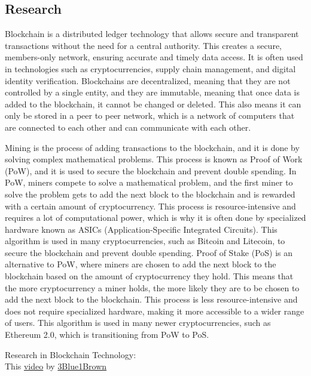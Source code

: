 \documentclass[12pt, a4paper]{scrartcl}
\begin{document}
\subsection{Research}

Blockchain is a distributed ledger technology that allows secure and transparent transactions without the need for a central authority.
This creates a secure, members-only network, ensuring accurate and timely data access. It is often used in technologies such as cryptocurrencies, supply chain management, and digital identity verification.
Blockchains are decentralized, meaning that they are not controlled by a single entity, and they are immutable, meaning that once data is added to the blockchain, it cannot be changed or deleted.
This also means it can only be stored in a peer to peer network, which is a network of computers that are connected to each other and can communicate with each other.


Mining is the process of adding transactions to the blockchain, and it is done by solving complex mathematical problems.
This process is known as Proof of Work (PoW), and it is used to secure the blockchain and prevent double spending.
In PoW, miners compete to solve a mathematical problem, and the first miner to solve the problem gets to add the next block to the blockchain and is rewarded with a certain amount of cryptocurrency.
This process is resource-intensive and requires a lot of computational power, which is why it is often done by specialized hardware known as ASICs (Application-Specific Integrated Circuits). 
This algorithm is used in many cryptocurrencies, such as Bitcoin and Litecoin, to secure the blockchain and prevent double spending.
Proof of Stake (PoS) is an alternative to PoW, where miners are chosen to add the next block to the blockchain based on the amount of cryptocurrency they hold.
This means that the more cryptocurrency a miner holds, the more likely they are to be chosen to add the next block to the blockchain.
This process is less resource-intensive and does not require specialized hardware, making it more accessible to a wider range of users.
This algorithm is used in many newer cryptocurrencies, such as Ethereum 2.0, which is transitioning from PoW to PoS.


Research in Blockchain Technology:
\\
This \href{https://youtu.be/bBC-nXj3Ng4?si=7UgRxuPQdJOzkzG4}{video}  by \href{https://www.youtube.com/@3blue1brown}{3Blue1Brown}

\newpage
\end{document}

